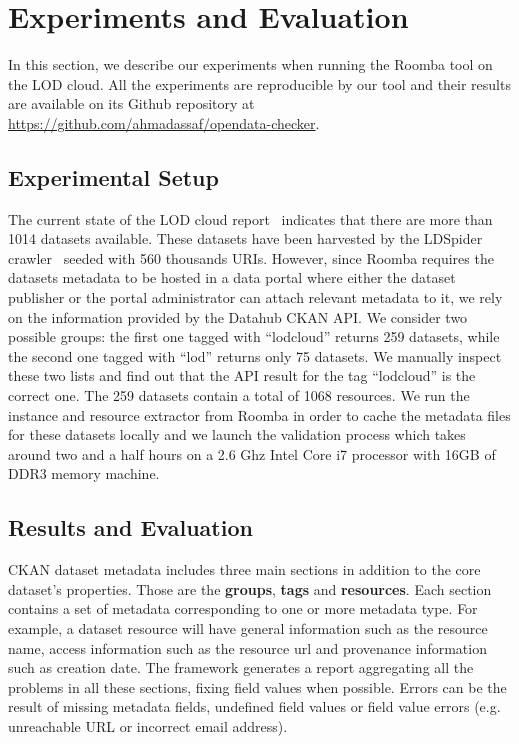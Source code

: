 \documentclass[runningheads,a4paper]{llncs}
\begin{document}

\section{Experiments and Evaluation}
\label{sec:experiment}
In this section, we describe our experiments when running the Roomba tool on the LOD cloud. All the experiments are reproducible by our tool and their results are available on its Github repository at \url{https://github.com/ahmadassaf/opendata-checker}.

\subsection{Experimental Setup}
The current state of the LOD cloud report~\cite{DBLP:conf/semweb/SchmachtenbergBP14} indicates that there are more than 1014 datasets available. These datasets have been harvested by the LDSpider crawler~\cite{conf/semweb/IseleUBH10} seeded with 560 thousands URIs. However, since Roomba requires the datasets metadata to be hosted in a data portal where either the dataset publisher or the portal administrator can attach relevant metadata to it, we rely on the information provided by the Datahub CKAN API. We consider two possible groups: the first one tagged with ``lodcloud'' returns 259 datasets, while the second one tagged with ``lod'' returns only 75 datasets. We manually inspect these two lists and find out that the API result for the tag ``lodcloud'' is the correct one. The 259 datasets contain a total of 1068 resources. We run the instance and resource extractor from Roomba in order to cache the metadata files for these datasets locally and we launch the validation process which takes around two and a half hours on a 2.6 Ghz Intel Core i7 processor with 16GB of DDR3 memory machine.

\subsection{Results and Evaluation}
CKAN dataset metadata includes three main sections in addition to the core dataset's properties. Those are the \textbf{groups}, \textbf{tags} and \textbf{resources}. Each section contains a set of metadata corresponding to one or more metadata type. For example, a dataset resource will have general information such as the resource name, access information such as the resource url and provenance information such as creation date. The framework generates a report aggregating all the problems in all these sections, fixing field values when possible. Errors can be the result of missing metadata fields, undefined field values or field value errors (e.g. unreachable URL or incorrect email address).
\end{document}
